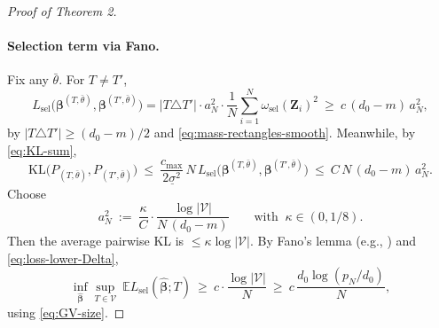 \documentclass[11pt]{article}
\newcommand{\E}{\mathbb{E}} %
\theoremstyle{plain}
\theoremstyle{definition}
\theoremstyle{plain}
\begin{document}
\begin{proof}[Proof of Theorem 2]
\paragraph{Selection term via Fano.}
Fix any $\bar\theta$. For $T\neq T'$,
\[
L_{\mathrm{sel}}\big(\bm\beta^{(T,\bar\theta)},\bm\beta^{(T',\bar\theta)}\big)
= |T\triangle T'|\cdot a_N^2\cdot \frac{1}{N}\sum_{i=1}^N \omega_{\mathrm{sel}}(\bm Z_i)^2
\ \ge\ c\, (d_0-m)\,a_N^2,
\]
by $|T\triangle T'|\ge (d_0-m)/2$ and \eqref{eq:mass-rectangles-smooth}. Meanwhile, by \eqref{eq:KL-sum},
\[
\mathrm{KL}\big(P_{(T,\bar\theta)},P_{(T',\bar\theta)}\big)\ \le\ 
\frac{c_{\max}}{2\underline\sigma^2}\,N\, L_{\mathrm{sel}}\big(\bm\beta^{(T,\bar\theta)},\bm\beta^{(T',\bar\theta)}\big)
\ \le\ C\,N\,(d_0-m)\,a_N^2.
\]
Choose
\begin{equation}\label{eq:aN-choice}
a_N^2\ :=\ \frac{\kappa}{C}\cdot \frac{\log|\mathcal V|}{N\,(d_0-m)}\qquad\text{with }\ \kappa\in(0,1/8).
\end{equation}
Then the average pairwise KL is $\le \kappa \log|\mathcal V|$.
By Fano’s lemma (e.g., \citealt[Th.\ 2.11]{Tsybakov2009}) and \eqref{eq:loss-lower-Delta},
\[
\inf_{\widehat{\bm\beta}} \sup_{T\in\mathcal V}\ \E L_{\mathrm{sel}}(\widehat{\bm\beta};T)
\ \ge\ c\cdot \frac{\log|\mathcal V|}{N}
\ \ge\ c\,\frac{d_0\log(p_N/d_0)}{N},
\]
using \eqref{eq:GV-size}.


\end{proof}
\end{document}
